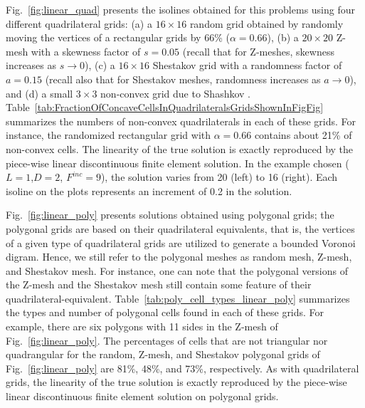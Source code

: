 \documentclass[preprint,10pt]{elsarticle}
\newcommand{\fig}[1]{Fig.~\ref{#1}}                      %
\newcommand{\tbl}[1]{Table~\ref{#1}}                     %
\begin{document}
\fig{fig:linear_quad} presents the isolines obtained for this problems using four different quadrilateral grids:
(a) a $16 \times 16$ random grid obtained by randomly moving the vertices of a rectangular grids by 66\% ($\alpha=0.66$), 
(b) a $20 \times 20$ Z-mesh with a skewness factor of $s=0.05$ (recall that for Z-meshes, skewness increases
as $s\to 0$), 
(c) a $16 \times 16$ Shestakov grid  with a randomness factor of $a=0.15$ (recall also that for Shestakov meshes, 
randomness increases as $a\to 0$), and 
(d) a small $3 \times 3$ non-convex grid due to Shashkov \cite{ShashkovSteinberg1996}.
\tbl{tab:FractionOfConcaveCellsInQuadrilateralsGridsShownInFigFig} summarizes the numbers of non-convex quadrilaterals in each of these grids.  For instance, the randomized rectangular grid with $\alpha=0.66$ contains about 21\% of non-convex cells. 
The linearity of the true solution is exactly reproduced by the piece-wise linear discontinuous finite element solution. In the example chosen ($L=1$,$D=2$, $F^{inc}=9$), the solution varies from 20 (left) to 16 (right). Each isoline on the plots represents an increment of 0.2 in the solution.

\fig{fig:linear_poly} presents solutions obtained using polygonal grids; the polygonal grids are based on their quadrilateral equivalents, that is, the vertices of a given type of quadrilateral grids are utilized to generate a bounded Voronoi digram. Hence, we still refer to the polygonal meshes as random mesh, Z-mesh, and Shestakov mesh. For instance, one can note that the polygonal versions of the Z-mesh and the Shestakov mesh still contain some feature of their quadrilateral-equivalent. \tbl{tab:poly_cell_types_linear_poly} summarizes the types and number of polygonal cells found in each of these grids. 
For example, there are six polygons with 11 sides in the Z-mesh of \fig{fig:linear_poly}. The percentages of cells that are not triangular nor quadrangular for the random, Z-mesh, and Shestakov polygonal grids of \fig{fig:linear_poly} are 81\%, 48\%, and 73\%, respectively. As with quadrilateral grids, the linearity of the true solution is exactly reproduced by the piece-wise linear discontinuous finite element solution on polygonal grids.
\end{document}
